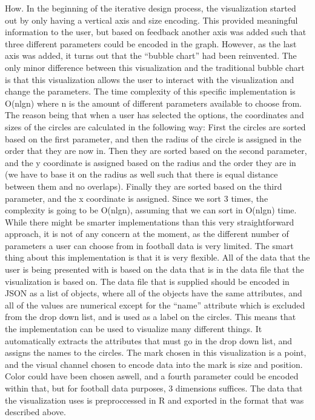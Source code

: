 \documentclass[Report.tex]{subfiles}
\begin{document}
\noindent How. In the beginning of the iterative design process, the visualization started out by only having a vertical axis and size encoding. This provided meaningful information to the user, but based on feedback another axis was added such that three different parameters could be encoded in the graph. However, as the last axis was added, it turns out that the ``bubble chart'' had been reinvented. The only minor difference between this visualization and the traditional bubble chart is that this visualization allows the user to interact with the visualization and change the parameters. The time complexity of this specific implementation is O(nlgn) where n is the amount of different parameters available to choose from. The reason being that when a user has selected the options, the coordinates and sizes of the circles are calculated in the following way: First the circles are sorted based on the first parameter, and then the radius of the circle is assigned in the order that they are now in. Then they are sorted based on the second parameter, and the y coordinate is assigned based on the radius and the order they are in (we have to base it on the radius as well such that there is equal distance between them and no overlaps). Finally they are sorted based on the third parameter, and the x coordinate is assigned. Since we sort 3 times, the complexity is going to be O(nlgn), assuming that we can sort in O(nlgn) time. While there might be smarter implementations than this very straightforward approach, it is not of any concern at the moment, as the different number of parameters a user can choose from in football data is very limited. The smart thing about this implementation is that it is very flexible. All of the data that the user is being presented with is based on the data that is in the data file that the visualization is based on. The data file that is supplied should be encoded in JSON as a list of objects, where all of the objects have the same attributes, and all of the values are numerical except for the ``name'' attribute which is excluded from the drop down list, and is used as a label on the circles. This means that the implementation can be used to visualize many different things. It automatically extracts the attributes that must go in the drop down list, and assigns the names to the circles. The mark chosen in this visualization is a point, and the visual channel chosen to encode data into the mark is size and position. Color could have been chosen aswell, and a fourth parameter could be encoded within that, but for football data purposes, 3 dimensions suffices. The data that the visualization uses is preproccessed in R and exported in the format that was described above.
\end{document}
